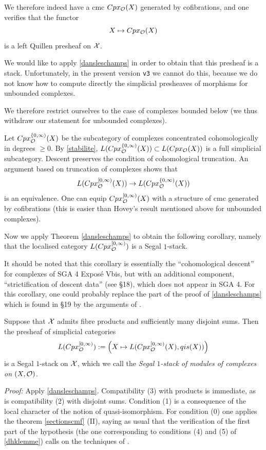 
We therefore indeed have a cmc $Cpx_{{\cal O}}(X)$ generated by cofibrations, and one
verifies that the functor
$$
X\mapsto Cpx_{{\cal O}}(X)
$$
is a left Quillen presheaf on ${\cal X}$.

We would like to apply
\ref{dansleschamps} in order to obtain that this presheaf is a stack.
Unfortunately, in the present version {\tt v3} we cannot
do this, because we do not know how to compute directly the
simplicial presheaves of morphisms for unbounded complexes.

We therefore restrict ourselves to the case of complexes bounded below
(we thus withdraw our statement for unbounded complexes).

Let $Cpx_{{\cal O}}^{\{ 0,\infty )}(X)$ be the subcategory of complexes
concentrated
cohomologically in degrees $\geq 0$.
 By \ref{stabilite}, $L(Cpx_{{\cal O}}^{\{ 0,\infty )}(X))\subset
L(Cpx_{{\cal O}}(X))$ is a full simplicial subcategory.
Descent preserves the condition of cohomological truncation. An argument
based on truncation of complexes shows that
$$
L(Cpx_{{\cal O}}^{[0,\infty )}(X))\rightarrow L(Cpx_{{\cal O}}^{\{ 0,\infty )}(X))
$$
is an equivalence. One can equip $Cpx_{{\cal O}}^{[0,\infty )}(X)$ with a
structure of cmc generated by cofibrations (this is easier than Hovey's
result mentioned above for unbounded complexes).


Now we apply Theorem
\ref{dansleschamps} to obtain the following corollary,
namely that the localised category $L(Cpx_{{\cal O}}^{[0,\infty )})$
is a Segal
$1$-stack.

It should be noted
that this corollary is
essentially the ``cohomological descent'' for complexes of SGA 4
\cite{SGA4b} Exposé Vbis,
but with an additional component,
``strictification of descent data''
(see \S18), which does not appear in SGA 4. For this corollary,
one could probably replace the part of
the proof of
\ref{dansleschamps} which is found in \S19 by the arguments of \cite{SGA4b}.


\begin{corollary}
\label{cestunchamp}
Suppose that ${\cal X}$ admits fibre products and sufficiently many disjoint
sums. Then the presheaf of simplicial categories
$$
L(Cpx_{{\cal O}}^{[0,\infty )}):=
\left( X\mapsto  L(Cpx_{{\cal O}}^{[0,\infty )}(X), qis(X)) \right)
$$
is a Segal $1$-stack on ${\cal X}$, which we call the {\em Segal $1$-stack of
modules of complexes on $(X,{\cal O} )$}.
\end{corollary}
{\em Proof:} Apply \ref{dansleschamps}. Compatibility (3) with
products is immediate, as is compatibility (2) with disjoint
sums. Condition (1) is a consequence of the local character of the
notion of quasi-isomorphism. For condition (0) one applies the theorem
\ref{sectionscmf}
(II), saying as usual that the verification of the first
part of the hypothesis
(the one corresponding to conditions (4) and (5) of \ref{dhklemme}) calls on
the techniques of
\cite{Jardine}.

